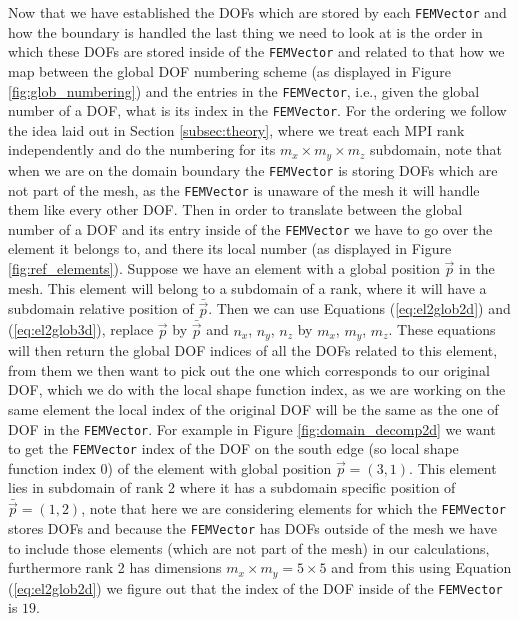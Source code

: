 Now that we have established the DOFs which are stored by each \texttt{FEMVector} and how the boundary is handled the last thing we need to look at is the order in which these DOFs are stored inside of the \texttt{FEMVector} and related to that how we map between the global DOF numbering scheme (as displayed in Figure \ref{fig:glob_numbering}) and the entries in the \texttt{FEMVector}, i.e., given the global number of a DOF, what is its index in the \texttt{FEMVector}. For the ordering we follow the idea laid out in Section \ref{subsec:theory}, where we treat each MPI rank independently and do the numbering for its $m_x \times m_y \times m_z$ subdomain, note that when we are on the domain boundary the \texttt{FEMVector} is storing DOFs which are not part of the mesh, as the \texttt{FEMVector} is unaware of the mesh it will handle them like every other DOF. Then in order to translate between the global number of a DOF and its entry inside of the \texttt{FEMVector} we have to go over the element it belongs to, and there its local number (as displayed in Figure \ref{fig:ref_elements}). Suppose we have an element with a global position $\vec{p}$ in the mesh. This element will belong to a subdomain of a rank, where it will have a subdomain relative position of $\bar{\vec{p}}$. Then we can use Equations (\ref{eq:el2glob2d}) and (\ref{eq:el2glob3d}), replace $\vec{p}$ by $\bar{\vec{p}}$ and $n_x$, $n_y$, $n_z$ by $m_x$, $m_y$, $m_z$. These equations will then return the global DOF indices of all the DOFs related to this element, from them we then want to pick out the one which corresponds to our original DOF, which we do with the local shape function index, as we are working on the same element the local index of the original DOF will be the same as the one of DOF in the \texttt{FEMVector}. For example in Figure \ref{fig:domain_decomp2d} we want to get the \texttt{FEMVector} index of the DOF on the south edge (so local shape function index \(0\)) of the element with global position $\vec p = (3,1)$. This element lies in subdomain of rank 2 where it has a subdomain specific position of \(\bar{\vec{p}} = (1,2)\), note that here we are considering elements for which the \texttt{FEMVector} stores DOFs and because the \texttt{FEMVector} has DOFs outside of the mesh we have to include those elements (which are not part of the mesh) in our calculations, furthermore rank 2 has dimensions \(m_x \times m_y = 5\times 5\) and from this using Equation (\ref{eq:el2glob2d}) we figure out that the index of the DOF inside of the \texttt{FEMVector} is \(19\).\medskip

